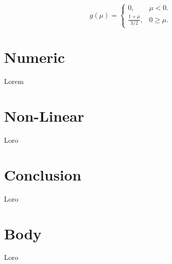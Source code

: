 \documentclass[twocolumn]{aastex631}
\begin{document}
\begin{equation}
g(\mu)=\begin{cases}
    0, & \mu < 0.\\
    \frac{1 + \mu}{3/2}, & 0 \geq \mu .
\end{cases}
\end{equation} 


\section{Numeric} \label{sec:numeric}
Lorem

\section{Non-Linear} \label{sec:nonlinear}
Loro

\section{Conclusion} \label{sec:conclusions}
Loro

\section{Body} \label{sec:body}
Loro


\end{document}

